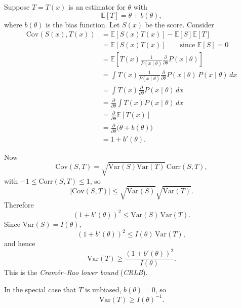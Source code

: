 \documentclass[11pt, titlepage]{article} %
\numberwithin{equation}{section}
\theoremstyle{definition}
\numberwithin{assumption}{section}
\begin{document}
Suppose $T=T(x)$ is an estimator for $\theta$ with
\begin{equation*}
    \mathbb{E}[T]=\theta+b(\theta),
\end{equation*}
where $b(\theta)$ is the bias function. Let $S(x)$ be the score. Consider
\begin{align*}
    \mathrm{Cov}(S(x),T(x))
    &= \mathbb{E}[S(x)T(x)]-\mathbb{E}[S]\mathbb{E}[T]\\
    &= \mathbb{E}[S(x)T(x)]
    \qquad \text{since } \mathbb{E}[S]=0\\
    &= \mathbb{E}\!\left[
    T(x)\frac{1}{P(x\mid \theta)}
    \frac{\partial}{\partial \theta}P(x\mid \theta)
    \right]\\
    &= \int
    T(x)\frac{1}{P(x\mid \theta)}
    \frac{\partial}{\partial \theta}P(x\mid \theta)\,
    P(x\mid \theta)\,dx\\
    &= \int T(x)\frac{\partial}{\partial \theta}P(x\mid \theta)\,dx\\
    &= \frac{\partial}{\partial \theta}\int T(x)P(x\mid \theta)\,dx\\
    &= \frac{\partial}{\partial \theta}\mathbb{E}[T(x)]\\
    &= \frac{\partial}{\partial \theta}\bigl(\theta+b(\theta)\bigr)\\
    &= 1+b'(\theta).
\end{align*}

Now
\begin{equation*}
    \mathrm{Cov}(S,T)=\sqrt{\mathrm{Var}(S)\mathrm{Var}(T)}\,\mathrm{Corr}(S,T),
\end{equation*}
with $-1\le \mathrm{Corr}(S,T)\le 1$, so
\begin{equation*}
    |\mathrm{Cov}(S,T)|\le \sqrt{\mathrm{Var}(S)}\sqrt{\mathrm{Var}(T)}.
\end{equation*}
Therefore
\begin{equation*}
    (1+b'(\theta))^2\le \mathrm{Var}(S)\,\mathrm{Var}(T).
\end{equation*}
Since $\mathrm{Var}(S)=I(\theta)$,
\begin{equation*}
    (1+b'(\theta))^2\le I(\theta)\,\mathrm{Var}(T),
\end{equation*}
and hence
\begin{equation*}
    \mathrm{Var}(T)\ge \frac{(1+b'(\theta))^2}{I(\theta)}.
\end{equation*}
This is the \textit{Cram\'er--Rao lower bound} (\textit{CRLB}).

In the special case that $T$ is unbiased, $b(\theta)=0$, so
\begin{equation*}
    \mathrm{Var}(T)\ge I(\theta)^{-1}.
\end{equation*}
\end{document}
